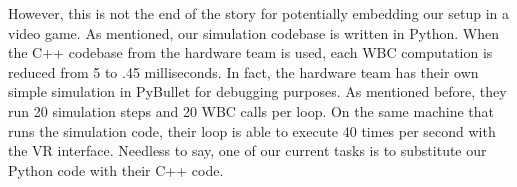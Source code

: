 However, this is not the end of the story for potentially embedding our setup in a video game. As mentioned, our simulation codebase is written in Python. When the C++ codebase from the hardware team is used, each WBC computation is reduced from 5 to .45 milliseconds. In fact, the hardware team has their own simple simulation in PyBullet for debugging purposes. As mentioned before, they run 20 simulation steps and 20 WBC calls per loop. On the same machine that runs the simulation code, their loop is able to execute 40 times per second with the VR interface. Needless to say, one of our current tasks is to substitute our Python code with their C++ code.
